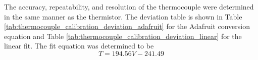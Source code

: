 The accuracy, repeatability, and resolution of the thermocouple were determined in the same manner as the thermistor. The deviation table is shown in
Table \ref{tab:thermocouple_calibration_deviation_adafruit} for the Adafruit conversion equation and Table \ref{tab:thermocouple_calibration_deviation_linear} 
for the linear fit. The fit equation was determined to be
\begin{equation}
    T = 194.56 V - 241.49 \label{eq:thermocouple_calibration}
\end{equation}


